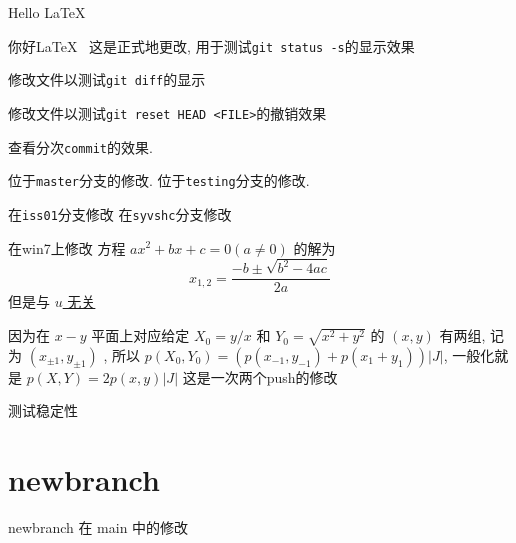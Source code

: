 \documentclass{ctexart}
\begin{document}
	Hello \LaTeX~

	你好\LaTeX~ %
	这是正式地更改, 用于测试\verb|git status -s|的显示效果

	修改文件以测试\verb|git diff|的显示

	修改文件以测试\verb|git reset HEAD <FILE>|的撤销效果

	查看分次\verb|commit|的效果. 

	位于\verb|master|分支的修改. 
	位于\verb|testing|分支的修改. 
	
	在\verb|iss01|分支修改
	在\verb|syvshc|分支修改

	在win7上修改
	方程 $ ax^{2}+bx+c=0(a\ne 0) $ 的解为
	\[
		x_{1, 2}=\frac{-b\pm\sqrt{b^{2}-4ac}}{2a}
	\]
	但是与 \uline{$ u $ 无关}

	因为在 $ x-y $ 平面上对应给定 $ X_{0}=y/x $ 和 $ Y_{0}=\sqrt{x^{2}+y^{2}} $ 的 $ (x, y) $ 有两组, 记为 $ (x_{\pm1}, y_{\pm1}) $ , 所以 $ p(X_{0}, Y_{0})=(p(x_{-1}, y_{-1})+p(x_{1}+y_{1}))|J| $, 一般化就是 $ p(X, Y)=2p(x, y)|J| $
	这是一次两个push的修改

	测试稳定性
	\section{newbranch}
	newbranch 在 main 中的修改
\end{document}
